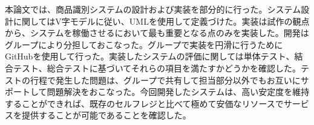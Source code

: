 本論文では、商品識別システムの設計および実装を部分的に行った。システム設計に関してはV字モデルに従い、UMLを使用して定義づけた。実装は試作の観点から、システムを稼働させるにおいて最も重要となる点のみを実装した。開発はグループにより分担しておこなった。グループで実装を円滑に行うためにGitHubを使用して行った。実装したシステムの評価に関しては単体テスト、結合テスト、総合テストに基づいてそれらの項目を満たすかどうかを確認した。テストの行程で発生した問題は、グループで共有して担当部分以外でもお互いにサポートして問題解決をおこなった。今回開発したシステムは、高い安定度を維持することができれば、既存のセルフレジと比べて極めて安価なリソースでサービスを提供することが可能であることを確認した。
